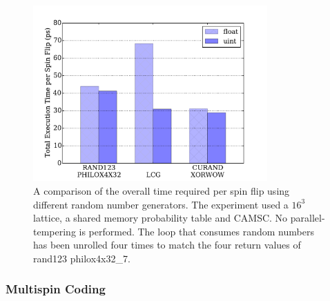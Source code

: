 \begin{figure}[!ht]
  \centering
  \includegraphics[width=0.8\textwidth]{img/rng.pdf}
  \caption{A comparison of the overall time required per spin flip using different random number generators. 
  The experiment used a $16^3$ lattice, a shared memory probability table and CAMSC. No 
  parallel-tempering is performed. The loop that consumes random numbers has been unrolled four 
  times to match the four return values of rand123 philox4x32\_7.} 
  \label{fig_rng}
\end{figure}







\subsubsection{Multispin Coding}

\label{section_msc}

